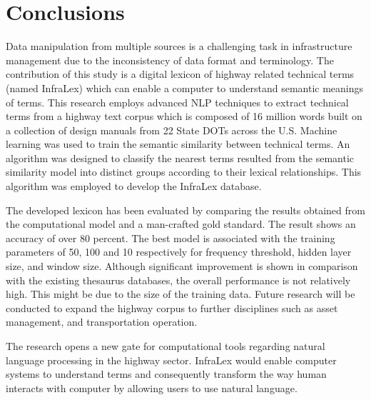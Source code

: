 \documentclass[Journal,InsideFigs, DoubleSpace]{ascelike} %
\begin{document}
\section{Conclusions} \label{sec:conclns3} 
Data manipulation from multiple sources is a challenging task in infrastructure management due to the inconsistency of data format and terminology. The contribution of this study is a digital lexicon of highway related technical terms (named InfraLex) which can enable a computer to understand semantic meanings of terms.  This research employs advanced NLP techniques to extract technical terms from a highway text corpus which is composed of 16 million words built on a collection of design manuals from 22 State DOTs across the U.S. Machine learning was used to train the semantic similarity between technical terms. An algorithm was designed to classify the nearest terms resulted from the semantic similarity model into distinct groups according to their lexical relationships. This algorithm was employed to develop the InfraLex database. 
\par
The developed lexicon has been evaluated by comparing the results obtained from the computational model and a man-crafted gold standard. The result shows an accuracy of over 80 percent.  The best model is associated with the training parameters of 50, 100 and 10 respectively for frequency threshold, hidden layer size, and window size. Although significant improvement is shown in comparison with the existing thesaurus databases, the overall performance is not relatively high. This might be due to the size of the training data. Future research will be conducted to expand the highway corpus to further disciplines such as asset management, and transportation operation. 
\par
The research opens a new gate for computational tools regarding natural language processing in the highway sector. InfraLex would enable computer systems to understand terms and consequently transform the way human interacts with computer by allowing users to use natural language. 


%
%
\end{document}

